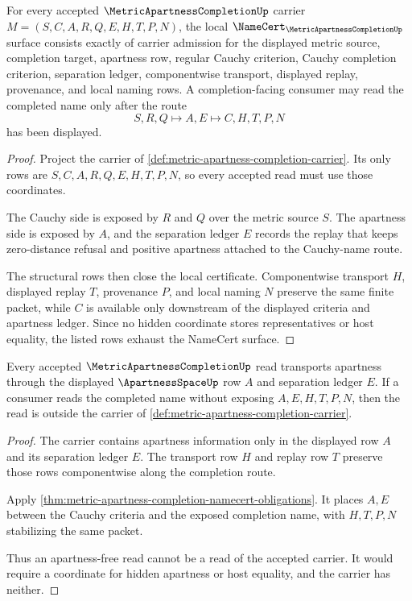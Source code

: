 \begin{theorem}
\label{thm:metric-apartness-completion-namecert-obligations}
For every accepted $\MetricApartnessCompletionUp$ carrier $M=(S,C,A,R,Q,E,H,T,P,N)$, the local $\NameCert_{\MetricApartnessCompletionUp}$ surface consists exactly of carrier admission for the displayed metric source, completion target, apartness row, regular Cauchy criterion, Cauchy completion criterion, separation ledger, componentwise transport, displayed replay, provenance, and local naming rows. A completion-facing consumer may read the completed name only after the route
$$
S,R,Q \longmapsto A,E \longmapsto C,H,T,P,N
$$
has been displayed.
\end{theorem}
\begin{proof}
Project the carrier of \autoref{def:metric-apartness-completion-carrier}. Its only rows are $S,C,A,R,Q,E,H,T,P,N$, so every accepted read must use those coordinates.

The Cauchy side is exposed by $R$ and $Q$ over the metric source $S$. The apartness side is exposed by $A$, and the separation ledger $E$ records the replay that keeps zero-distance refusal and positive apartness attached to the Cauchy-name route.

The structural rows then close the local certificate. Componentwise transport $H$, displayed replay $T$, provenance $P$, and local naming $N$ preserve the same finite packet, while $C$ is available only downstream of the displayed criteria and apartness ledger. Since no hidden coordinate stores representatives or host equality, the listed rows exhaust the NameCert surface.
\end{proof}

\begin{theorem}
\label{thm:metric-apartness-completion-apartness-transport}
Every accepted $\MetricApartnessCompletionUp$ read transports apartness through the displayed $\ApartnessSpaceUp$ row $A$ and separation ledger $E$. If a consumer reads the completed name without exposing $A,E,H,T,P,N$, then the read is outside the carrier of \autoref{def:metric-apartness-completion-carrier}.
\end{theorem}
\begin{proof}
The carrier contains apartness information only in the displayed row $A$ and its separation ledger $E$. The transport row $H$ and replay row $T$ preserve those rows componentwise along the completion route.

Apply \autoref{thm:metric-apartness-completion-namecert-obligations}. It places $A,E$ between the Cauchy criteria and the exposed completion name, with $H,T,P,N$ stabilizing the same packet.

Thus an apartness-free read cannot be a read of the accepted carrier. It would require a coordinate for hidden apartness or host equality, and the carrier has neither.
\end{proof}

